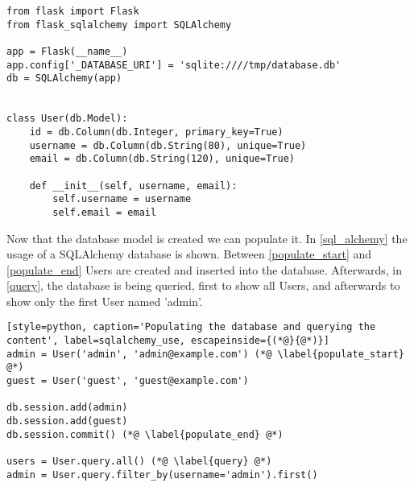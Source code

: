 \begin{lstlisting}[style=python, caption='A SQLAlchemy database model', label=sqlalchemy_model]
from flask import Flask
from flask_sqlalchemy import SQLAlchemy

app = Flask(__name__)
app.config['_DATABASE_URI'] = 'sqlite:////tmp/database.db'
db = SQLAlchemy(app)


class User(db.Model): 
    id = db.Column(db.Integer, primary_key=True)
    username = db.Column(db.String(80), unique=True)
    email = db.Column(db.String(120), unique=True)

    def __init__(self, username, email):
        self.username = username
        self.email = email
\end{lstlisting}

Now that the database model is created we can populate it.
In \cref{sql_alchemy} the usage of a SQLAlchemy database is shown.
Between \cref{populate_start} and \cref{populate_end} Users are created and inserted into the database.
Afterwards, in \cref{query}, the database is being queried, first to show all Users, and afterwards to show only the first User named 'admin'.

\begin{lstlisting}[style=python, caption='Populating the database and querying the content', label=sqlalchemy_use, escapeinside={(*@}{@*)}]
admin = User('admin', 'admin@example.com') (*@ \label{populate_start} @*)
guest = User('guest', 'guest@example.com')

db.session.add(admin)
db.session.add(guest)
db.session.commit() (*@ \label{populate_end} @*)

users = User.query.all() (*@ \label{query} @*)
admin = User.query.filter_by(username='admin').first()
\end{lstlisting}


